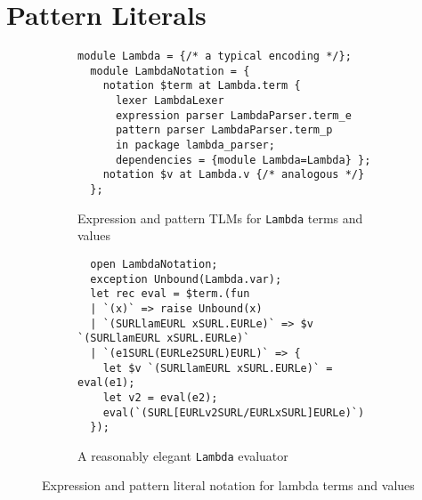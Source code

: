 \documentclass[acmsmall]{acmart}
\makeatletter
\renewcommand{\subsubsection}{%
  \@startsection{subsubsection}{3}%
  {\z@}{1ex \@plus .2ex \@minus .2ex}{-1em}%
  {\normalfont\normalsize\bfseries}%
}
\newcommand{\li}[1]{\lstinline[basicstyle=\ttfamily\fontsize{9pt}{1em}\selectfont]{#1}}
\newcommand{\lismall}[1]{\lstinline[basicstyle=\ttfamily\fontsize{9pt}{1em}\selectfont]{#1}}
\makeatother
\begin{document}



\section{Pattern Literals}
\label{sec:sptsms}

\begin{figure}[t]
\begin{subfigure}[t]{0.55\textwidth}
\begin{lstlisting}[morekeywords={expression}]
  module Lambda = {/* a typical encoding */};
  module LambdaNotation = {
    notation $term at Lambda.term { 
      lexer LambdaLexer
      expression parser LambdaParser.term_e
      pattern parser LambdaParser.term_p
      in package lambda_parser;
      dependencies = {module Lambda=Lambda} };
    notation $v at Lambda.v {/* analogous */}
  };
\end{lstlisting}
\vspace{-6px}
\caption{Expression and pattern TLMs for \lismall{Lambda} terms and values}
\label{fig:lam}
\vspace{2px}
\end{subfigure}
\hfill
\begin{subfigure}[t]{0.42\textwidth}
\begin{lstlisting}
  open LambdaNotation;
  exception Unbound(Lambda.var);
  let rec eval = $term.(fun 
  | `(x)` => raise Unbound(x)
  | `(SURLlamEURL xSURL.EURLe)` => $v `(SURLlamEURL xSURL.EURLe)`
  | `(e1SURL(EURLe2SURL)EURL)` => {
    let $v `(SURLlamEURL xSURL.EURLe)` = eval(e1);
    let v2 = eval(e2);
    eval(`(SURL[EURLv2SURL/EURLxSURL]EURLe)`) 
  });
\end{lstlisting}
\vspace{-6px}
\caption{A reasonably elegant \lismall{Lambda} evaluator}
\label{fig:lam-eval}
\end{subfigure}
\caption{Expression and pattern literal notation for lambda terms and values}
\vspace{-8px}
\label{fig:lam-example}
\end{figure}
\end{document}
